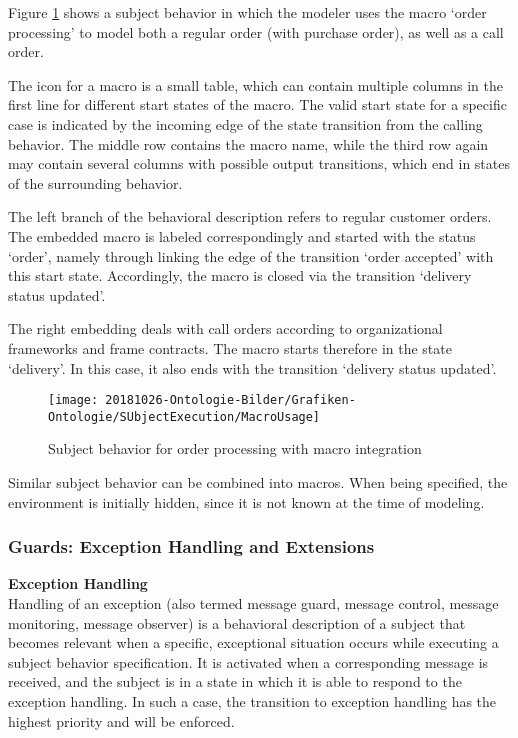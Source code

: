 Figure \ref{fig:macrousage} shows a subject behavior in which the modeler uses the macro ‘order processing’ to model both a regular order (with purchase order), as well as a call order.

The icon for a macro is a small table, which can contain multiple columns in the first line for different start states of the macro. The valid start state for a specific case is indicated by the incoming edge of the state transition from the calling behavior. The middle row contains the macro name, while the third row again may contain several columns with possible output transitions, which end in states of the surrounding behavior.

The left branch of the behavioral description refers to regular customer orders. The embedded macro is labeled correspondingly and started with the status ‘order’, namely through linking the edge of the transition ‘order accepted’ with this start state. Accordingly, the macro is closed via the transition ‘delivery status updated’.

The right embedding deals with call orders according to organizational frameworks and frame contracts. The macro starts therefore in the state ‘delivery’. In this case, it also ends with the transition ‘delivery status updated’.

\begin{figure}[ph]
	\centering
	\texttt{[image: 20181026-Ontologie-Bilder/Grafiken-Ontologie/SUbjectExecution/MacroUsage]}
	\caption[Subject behavior for order processing with macro integration]{Subject behavior for order processing with macro integration}
	\label{fig:macrousage}
\end{figure}

Similar subject behavior can be combined into macros. When being specified, the environment is initially hidden, since it is not known at the time of modeling.

\newpage

\subsubsection{Guards: Exception Handling and Extensions} 

\textbf{Exception Handling}\\
Handling of an exception (also termed message guard, message control, message monitoring, message observer) is a behavioral description of a subject that becomes relevant when a specific, exceptional situation occurs while executing a subject behavior specification. It is activated when a corresponding message is received, and the subject is in a state in which it is able to respond to the exception handling. In such a case, the transition to exception handling has the highest priority and will be enforced.


